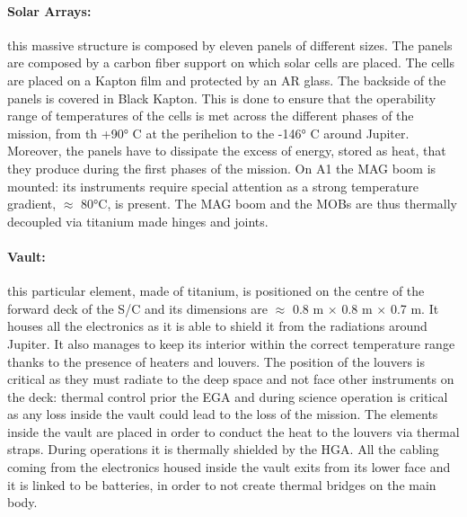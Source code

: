 \vspace{-4mm}

\paragraph{Solar Arrays:} this massive structure is composed by eleven panels of different sizes. The panels are composed by a carbon fiber support on which solar cells are placed. The cells are placed on a Kapton film and protected by an AR glass. The backside of the panels is covered in Black Kapton. This is done to ensure that the operability range of temperatures of the cells is met across the different phases of the mission, from th +90° C at the perihelion to the -146° C around Jupiter.\cite{pannelli} Moreover, the panels have to dissipate the excess of energy, stored as heat, that they produce during the first phases of the mission. On A1 the MAG boom is mounted: its instruments require special attention as a strong temperature gradient,  $\approx$ 80°C, is present.\cite{pannelli}
The MAG boom and the MOBs are thus thermally decoupled via titanium made hinges and joints.\cite{pannelli}

\vspace{-4mm}

\paragraph{Vault:}this particular element, made of titanium, is positioned on the centre of the forward deck of the S/C and its dimensions are  $\approx$ 0.8 m $\times$ 0.8 m $\times$ 0.7 m.\cite{Rad_vault} It houses all the electronics as it is able to shield it from the radiations around Jupiter. It also manages to keep its interior within the correct temperature range thanks to the presence of heaters and louvers. The position of the louvers is critical as they must radiate to the deep space and not face other instruments on the deck: thermal control prior the EGA and during science operation is critical as any loss inside the vault could lead to the loss of the mission. The elements inside the vault are placed in order to conduct the heat to the louvers via thermal straps.\cite{louvers} During operations it is thermally shielded by the HGA. All the cabling coming from the electronics housed inside the vault exits from its lower face and it is linked to be batteries, in order to not create thermal bridges on the main body.

\vspace{-4mm}

